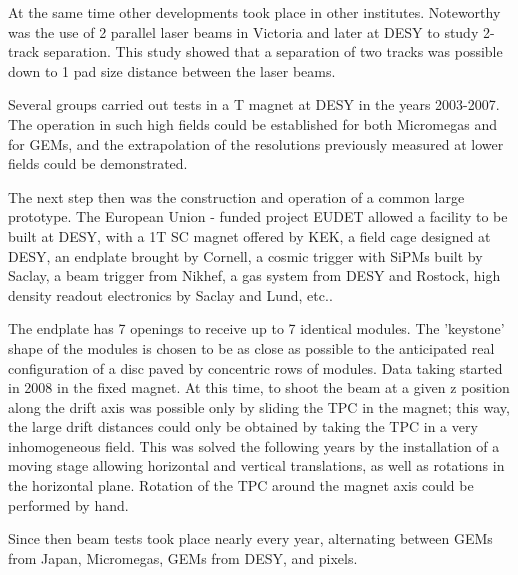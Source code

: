 At the same time other developments took place in other institutes. Noteworthy was the use of 2 parallel laser beams in Victoria and later at DESY to study 2-track separation. This study showed that a separation of two tracks was possible down to 1 pad size distance between the laser beams.

Several groups carried out tests in a \unit[5]{T} magnet at DESY in the years 2003-2007. The operation in such high fields could be established for both Micromegas and for GEMs, and the extrapolation of the resolutions previously measured at lower fields could be demonstrated.

The next step then was the construction and operation of a common large prototype. The European Union - funded project EUDET allowed a facility to be built at DESY, with a 1T SC magnet offered by KEK, a field cage designed at DESY, an endplate brought by Cornell, a cosmic trigger with SiPMs built by Saclay, a beam trigger from Nikhef, a gas system from DESY and Rostock, high density readout electronics by Saclay and Lund, etc..

The endplate has 7 openings to receive up to 7 identical modules. The 'keystone' shape of the modules is chosen to be as close as possible to the anticipated real configuration of a disc paved by concentric rows of modules. Data taking started in 2008 in the fixed magnet. At this time, to shoot the beam at a given z position along the drift axis was possible only by sliding the TPC in the  magnet; this way, the large drift distances could only be obtained by taking the TPC in a very inhomogeneous field. This was solved the following years by the installation of a moving stage allowing horizontal and vertical translations, as well as rotations in the horizontal plane. Rotation of the TPC around the  magnet axis could be performed by hand.

Since then beam tests took place nearly every year, alternating between GEMs from Japan, Micromegas, GEMs from DESY, and pixels.

%
%









